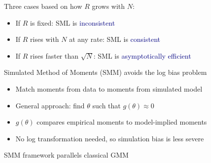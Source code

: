 \documentclass[aspectratio=169]{beamer}
\begin{document}
\begin{frame}

Three cases based on how $R$ grows with $N$:

\bigskip

\begin{itemize}
\itemsep1.5em
\item<2-> If $R$ is fixed: SML is \textcolor{navy}{inconsistent}
\item<3-> If $R$ rises with $N$ at any rate: SML is \textcolor{navy}{consistent}
\item<4-> If $R$ rises faster than $\sqrt{N}$: SML is \textcolor{navy}{asymptotically efficient}
\end{itemize}

\bigskip
{}

\end{frame}




\begin{frame}

Simulated Method of Moments (SMM) avoids the log bias problem

\bigskip

\begin{itemize}
\itemsep1.5em
\item<2-> Match moments from data to moments from simulated model
\item<3-> General approach: find $\theta$ such that $g(\theta) \approx 0$
\item<4-> $g(\theta)$ compares empirical moments to model-implied moments
\item<5-> No log transformation needed, so simulation bias is less severe
\end{itemize}

\end{frame}

\begin{frame}

SMM framework parallels classical GMM

\bigskip




\end{frame}
\end{document}
